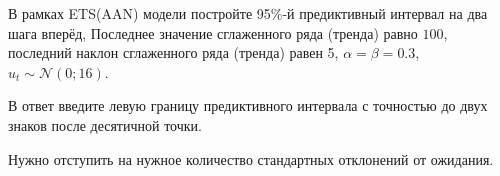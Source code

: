 
\begin{question}
В рамках ETS(AAN) модели постройте 95\%-й предиктивный интервал на два шага вперёд,
Последнее значение сглаженного ряда (тренда) равно \(100\),
последний наклон сглаженного ряда (тренда) равен 5, \(\alpha = \beta = 0.3\),
\(u_t \sim \mathcal{N}(0; 16)\).

В ответ введите левую границу предиктивного интервала с точностью до двух знаков после десятичной точки.
\end{question}

\begin{solution}
Нужно отступить на нужное количество стандартных отклонений от ожидания.
\end{solution}

